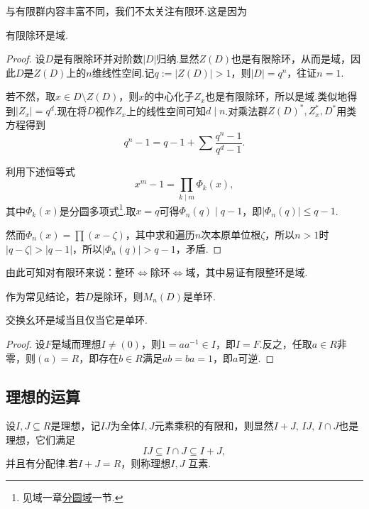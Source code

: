 与有限群内容丰富不同，我们不太关注有限环.这是因为
\begin{thm}[(Wedderburn)]
    有限除环是域.
\end{thm}
\begin{proof}
    设$D$是有限除环并对阶数$|D|$归纳.显然$Z(D)$也是有限除环，从而是域，因此$D$是$Z(D)$上的$n$维线性空间.记$q:=|Z(D)|>1$，则$|D|=q^n$，往证$n=1$.

    若不然，取$x\in D\setminus Z(D)$，则$x$的中心化子$Z_x$也是有限除环，所以是域.类似地得到$|Z_x|=q^d$.现在将$D$视作$Z_x$上的线性空间可知$d\mid n$.对乘法群$Z(D)^*,Z_x^*,D^*$用类方程得到
    \[
        q^n-1=q-1+\sum\frac{q^n-1}{q^d-1}.
    \]

    利用下述恒等式
    \[
        x^m-1=\prod_{k\mid m}\Phi_k(x),
    \]
    其中$\Phi_k(x)$是分圆多项式\footnote{见域一章\hyperlink{subsec:cyclotomic}{分圆域}一节.}.取$x=q$可得$\Phi_n(q)\mid q-1$，即$|\Phi_n(q)|\le q-1$.

    然而$\Phi_n(x)=\prod(x-\zeta)$，其中求和遍历$n$次本原单位根$\zeta$，所以$n>1$时$|q-\zeta|>|q-1|$，所以$|\Phi_n(q)|>q-1$，矛盾.
\end{proof}
\begin{remark}
    由此可知对有限环来说：整环$\Leftrightarrow$除环$\Leftrightarrow$域，其中易证有限整环是域.
\end{remark}
\begin{remark}
    作为常见结论，若$D$是除环，则$M_n(D)$是单环.
\end{remark}

\begin{prop}
    交换幺环是域当且仅当它是单环.
\end{prop}
\begin{proof}
    设$F$是域而理想$I\ne(0)$，则$1=aa^{-1}\in I$，即$I=F$.反之，任取$a\in R$非零，则$(a)=R$，即存在$b\in R$满足$ab=ba=1$，即$a$可逆.
\end{proof}

\subsection{理想的运算}
设$I,J\subseteq R$是理想，记$IJ$为全体$I,J$元素乘积的有限和，则显然$I+J,\,IJ,\,I\cap J$也是理想，它们满足
\[
    IJ\subseteq I\cap J\subseteq I+J,
\]
并且有分配律.若$I+J=R$，则称理想$I,J$ {\heiti 互素}.

